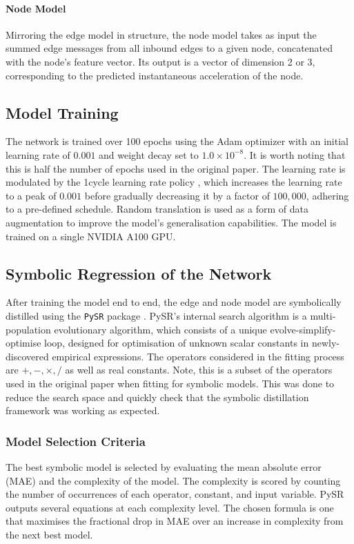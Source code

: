 \documentclass[11pt]{article}
\begin{document}
\paragraph*{Node Model} Mirroring the edge model in structure, the node model takes as input the summed edge messages from all inbound edges to a given node, concatenated with the node's feature vector. Its output is a vector of dimension 2 or 3, corresponding to the predicted instantaneous acceleration of the node.

\subsection{Model Training}
The network is trained over 100 epochs using the Adam optimizer with an initial learning rate of \(0.001\) and weight decay set to \(1.0 \times 10^{-8}\). It is worth noting that this is half the number of epochs used in the original paper. The learning rate is modulated by the 1cycle learning rate policy \cite{smith2018superconvergence}, which increases the learning rate to a peak of \(0.001\) before gradually decreasing it by a factor of \(100,000\), adhering to a pre-defined schedule. Random translation is used as a form of data augmentation to improve the model's generalisation capabilities. The model is trained on a single NVIDIA A100 GPU.

\subsection{Symbolic Regression of the Network}
After training the model end to end, the edge and node model are symbolically distilled using the \texttt{PySR} package \cite{cranmer2023interpretable}. PySR's internal search algorithm is a multi-population evolutionary algorithm, which consists of a unique evolve-simplify-optimise loop, designed for optimisation of unknown scalar constants in newly-discovered empirical expressions. The operators considered in the fitting process are $ +, -, \times , /$ as well as real constants. Note, this is a subset of the operators used in the original paper when fitting for symbolic models. This was done to reduce the search space and quickly check that the symbolic distillation framework was working as expected.

\subsubsection{Model Selection Criteria}
The best symbolic model is selected by evaluating the mean absolute error (MAE) and the complexity of the model. The complexity is scored by counting the number of occurrences of each operator, constant, and input variable. PySR outputs several equations at each complexity level. The chosen formula is one that maximises the fractional drop in MAE over an increase in complexity from the next best model.
\end{document}
